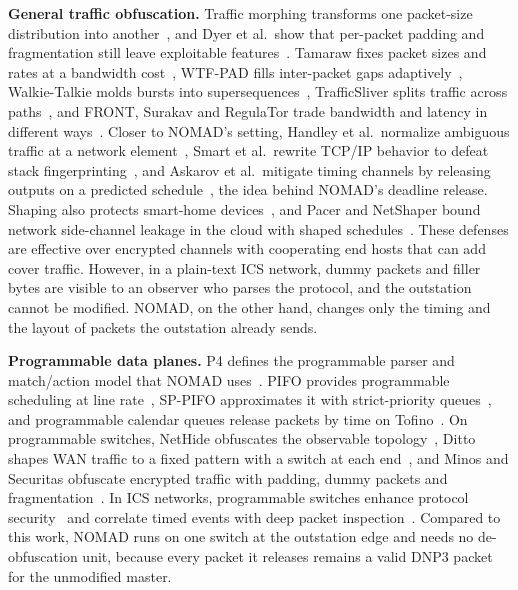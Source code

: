 \textbf{General traffic obfuscation.} Traffic morphing transforms one packet-size distribution into another~\cite{wright2009}, and Dyer et al.\ show that per-packet padding and fragmentation still leave exploitable features~\cite{dyer2012}. Tamaraw fixes packet sizes and rates at a bandwidth cost~\cite{tamaraw2014}, WTF-PAD fills inter-packet gaps adaptively~\cite{juarez2016}, Walkie-Talkie molds bursts into supersequences~\cite{walkietalkie2017}, TrafficSliver splits traffic across paths~\cite{trafficsliver2020}, and FRONT, Surakav and RegulaTor trade bandwidth and latency in different ways~\cite{front2020,surakav2022,regulator2022}. Closer to NOMAD's setting, Handley et al.\ normalize ambiguous traffic at a network element~\cite{normalization2001}, Smart et al.\ rewrite TCP/IP behavior to defeat stack fingerprinting~\cite{smart2000}, and Askarov et al.\ mitigate timing channels by releasing outputs on a predicted schedule~\cite{askarov2010}, the idea behind NOMAD's deadline release. Shaping also protects smart-home devices~\cite{apthorpe2019}, and Pacer and NetShaper bound network side-channel leakage in the cloud with shaped schedules~\cite{pacer2022,netshaper2024}. These defenses are effective over encrypted channels with cooperating end hosts that can add cover traffic. However, in a plain-text ICS network, dummy packets and filler bytes are visible to an observer who parses the protocol, and the outstation cannot be modified. NOMAD, on the other hand, changes only the timing and the layout of packets the outstation already sends.

\textbf{Programmable data planes.} P4 defines the programmable parser and match/action model that NOMAD uses~\cite{p4ccr2014}. PIFO provides programmable scheduling at line rate~\cite{pifo2016}, SP-PIFO approximates it with strict-priority queues~\cite{sppifo2020}, and programmable calendar queues release packets by time on Tofino~\cite{calendarq2020}. On programmable switches, NetHide obfuscates the observable topology~\cite{nethide2018}, Ditto shapes WAN traffic to a fixed pattern with a switch at each end~\cite{ditto2022}, and Minos and Securitas obfuscate encrypted traffic with padding, dummy packets and fragmentation~\cite{minos2025,securitas2026}. In ICS networks, programmable switches enhance protocol security~\cite{hulin2023} and correlate timed events with deep packet inspection~\cite{idetect2026}. Compared to this work, NOMAD runs on one switch at the outstation edge and needs no de-obfuscation unit, because every packet it releases remains a valid DNP3 packet for the unmodified master.
